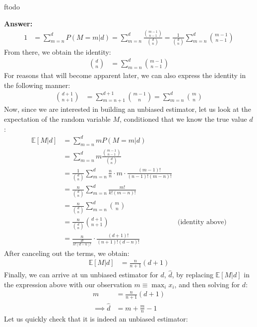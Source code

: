 ƒtodo\documentclass{article}
\newenvironment{QandA}{\begin{enumerate}[label=\arabic*.]}{\end{enumerate}}
\newenvironment{answer}{\par\normalfont \textbf{Answer:}}{}
\newcommand{\Exp}[1]{\mathbb{E}\left[ #1 \right]}
\newcommand{\g}{\vert}
\begin{document}
\begin{QandA}
\begin{answer}
\begin{align*}
            1 &= \sum_{m=n}^d P(M = m \g d) = \sum_{m=n}^d \frac{{ m-1 \choose n-1}}{{ d \choose n }} = \frac{1}{{ d \choose n }} \sum_{m=n}^d { m-1 \choose n-1}
        \end{align*}
        From there, we obtain the identity:
        \begin{align*}
            { d \choose n } &= \sum_{m=n}^d { m-1 \choose n-1} 
        \end{align*}
        For reasons that will become apparent later, we can also express the identity in the following manner:
        \begin{align*}
            { d+1 \choose n+1 } &= \sum_{m=n+1}^{d+1} { m-1 \choose n} = \sum_{m=n}^d {m \choose n }
        \end{align*}
        Now, since we are interested in building an unbiased estimator, let us look at the expectation of the random variable $M$, conditioned that we know the true value $d$:
        \begin{align*}
            \Exp{M \g d} &= \sum_{m=n}^d m P(M = m \g d) \\
            &= \sum_{m=n}^d m \frac{{ m-1 \choose n-1}}{{ d \choose n }} \\
            &= \frac{1}{{ d \choose n }} \sum_{m=n}^d \frac{n}{n} \cdot m \cdot \frac{(m-1)!}{(n-1)!(m-n)!} \\
            &= \frac{n}{{ d \choose n }} \sum_{m=n}^d \frac{m!}{k!(m-n)!} \\
            &= \frac{n}{{ d \choose n }} \sum_{m=n}^d {m \choose n} \\
            &= \frac{n}{{ d \choose n }} {d + 1 \choose n+1} &\text{(identity above)} \\
            &= \frac{n}{\frac{d!}{n!(d-n)!}} \cdot \frac{(d+1)!}{(n+1)!(d-n)!}
        \end{align*}
        After canceling out the terms, we obtain:
        \begin{align*}
            \Exp{M \g d} &= \frac{n}{n+1}(d+1)
        \end{align*} 
        Finally, we can arrive at un unbiased estimator for $d$, $\hat{d}$, by replacing $\Exp{M \g d}$ in the expression above with our observation $m \equiv \max_i x_i$, and then solving for $d$:
        \begin{align*}
            m &= \frac{n}{n+1}(d+1) \\
            \implies \hat{d} &= m + \frac{m}{n} - 1
        \end{align*}
        Let us quickly check that it is indeed an unbiased estimator:

\end{answer}
\end{QandA}
\end{document}
